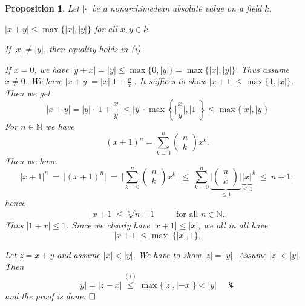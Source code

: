 \documentclass[11pt]{book}
\newtheorem{proposition}[theorem]{Proposition}
\theoremstyle{nonumberbreak}
\newenvironment{pr}[1][]{\ifthenelse{\equal{#1}{}}{\proof}{\proof[#1]}\rm}{\endproof}
\begin{document}
\begin{spacing}{1.3}
\begin{proposition} %
Let $|\cdot|$ be a nonarchimedean absolute value on a field $k$.
\begin{compactenum}
\item $|x+y| \leqslant \max\{|x|, |y|\}$ for all $x,y \in k$.
\item If $|x| \neq |y|$, then equality holds in (i).
\end{compactenum}
\begin{pr}
\begin{compactenum}
\item If $x=0$, we have $|y+x|=|y|\leqslant \max\{0,|y|\}=\max\{|x|,|y|\}$.
Thus assume $x \neq 0$. We have $|x+y|=|x|\big\vert 1+\frac{y}{x}\big \vert$.
It suffices to show $|x+1| \leqslant \max\{1, |x|\}$. Then we get
$$|x+y|=|y| \cdot \Big\vert 1+\frac{x}{y}\Big\vert \leqslant |y| \cdot \max\left\{\Big\vert \frac{x}{y}\Big \vert, \vert1\vert\right\} \leqslant \max\{|x|, |y|\}$$
For $n \in \mathbb{N}$ we have
$$(x+1)^n=\sum_{k=0}^n \begin{pmatrix}n \\k \end{pmatrix} x^k.$$
\newpage
Then we have
$$|x+1|^n\ =\ \vert(x+1)^n \vert \ =\ \bigg\vert \sum_{k=0}^n \begin{pmatrix}n \\k\end{pmatrix} x^k \bigg \vert\ \leqslant \ \sum_{k=0}^n \underbrace{\bigg\vert \begin{pmatrix}n \\k \end{pmatrix} \bigg \vert}_{\leqslant 1} {\underbrace{\vert x \vert}_{\leqslant 1} }^k \ \leqslant \ n+1,$$
hence $$|x+1| \leqslant \sqrt[n]{n+1} \qquad \textrm{ for all }n \in \mathbb{N}.$$ Thus $|1+x| \leqslant 1$. Since we clearly have $|x+1| \leqslant |x|$, we all in all have $$|x+1| \leqslant \max|\{|x|, 1\}.$$
\item Let $z=x+y$ and assume $|x|<|y|$. We have to show $|z|=|y|$. Assume $|z|<|y|$. Then
$$|y|=|z-x| \overset{(i)}{\leqslant} \max\{|z|, |-x|\} < |y| \quad \lightning$$
and the proof is done. $\hfill \Box$
\end{compactenum}
\end{pr}
\end{proposition}


\end{spacing}
\end{document}
